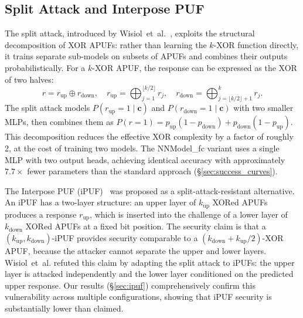 \subsection{Split Attack and Interpose PUF}

The split attack, introduced by Wisiol~et~al.~\cite{wisiol2020splitting},
exploits the structural decomposition of XOR APUFs: rather than learning the
$k$-XOR function directly, it trains separate sub-models on subsets of APUFs
and combines their outputs probabilistically.  For a $k$-XOR
APUF, the response can be expressed as the XOR of two halves:
\[
r = r_{\text{up}} \oplus r_{\text{down}},\quad
r_{\text{up}} = \bigoplus_{j=1}^{\lfloor k/2 \rfloor} r_j,\quad
r_{\text{down}} = \bigoplus_{j=\lfloor k/2 \rfloor+1}^{k} r_j.
\]
The split attack models $P(r_{\text{up}}=1 \mid \mathbf{c})$ and
$P(r_{\text{down}}=1 \mid \mathbf{c})$ with two smaller MLPs, then combines
them as $P(r=1) = p_{\text{up}}(1-p_{\text{down}}) + p_{\text{down}}(1-p_{\text{up}})$.
This decomposition reduces the effective XOR complexity by a factor of
roughly 2, at the cost of training two models.  The NNModel\_fc variant uses a
single MLP with two output heads, achieving identical accuracy with
approximately $7.7\times$ fewer parameters than the standard approach
(\S\ref{sec:success_curves}).

The Interpose PUF (iPUF)~\cite{nguyen2019} was proposed as a
split-attack-resistant alternative.  An iPUF has a two-layer structure: an
upper layer of $k_{\text{up}}$ XORed APUFs produces a response $r_{\text{up}}$,
which is inserted into the challenge of a lower layer of $k_{\text{down}}$
XORed APUFs at a fixed bit position.
The security claim is that a $(k_{\text{up}}, k_{\text{down}})$-iPUF provides
security comparable to a $(k_{\text{down}} + k_{\text{up}}/2)$-XOR APUF, because
the attacker cannot separate the upper and lower layers.  Wisiol~et~al. refuted
this claim by adapting the split attack to iPUFs: the upper layer is attacked
independently and the lower layer conditioned on the predicted upper response.
Our results (\S\ref{sec:ipuf}) comprehensively confirm this vulnerability
across multiple configurations, showing that iPUF security is substantially
lower than claimed.
